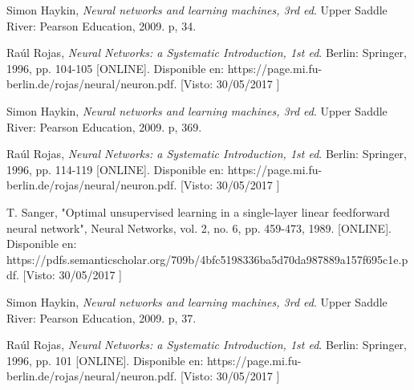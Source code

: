 \documentclass[11pt,spanish,answers]{exam}
\begin{document}
\begin{thebibliography}{1}

    Simon Haykin,
    \textit{Neural networks and learning machines, 3rd ed}. 
    Upper Saddle River: Pearson Education, 2009. p, 34.

    Raúl Rojas,
    \textit{Neural Networks: a Systematic Introduction, 1st ed}. 
    Berlin: Springer, 1996, pp. 104-105 [ONLINE]. Disponible en: https://page.mi.fu-berlin.de/rojas/neural/neuron.pdf. [Visto: 30/05/2017 ]

    Simon Haykin,
    \textit{Neural networks and learning machines, 3rd ed}. 
    Upper Saddle River: Pearson Education, 2009. p, 369.

    Raúl Rojas,
    \textit{Neural Networks: a Systematic Introduction, 1st ed}. 
    Berlin: Springer, 1996, pp. 114-119 [ONLINE]. Disponible en: https://page.mi.fu-berlin.de/rojas/neural/neuron.pdf. [Visto: 30/05/2017 ]


    T. Sanger,
    "Optimal unsupervised learning in a single-layer linear feedforward neural network", Neural Networks, vol. 2, no. 6, pp. 459-473, 1989. [ONLINE]. Disponible en: https://pdfs.semanticscholar.org/709b/4bfc5198336ba5d70da987889a157f695c1e.pdf. [Visto: 30/05/2017 ]

    Simon Haykin,
    \textit{Neural networks and learning machines, 3rd ed}. 
    Upper Saddle River: Pearson Education, 2009. p, 37.

    Raúl Rojas,
    \textit{Neural Networks: a Systematic Introduction, 1st ed}. 
    Berlin: Springer, 1996, pp. 101 [ONLINE]. Disponible en: https://page.mi.fu-berlin.de/rojas/neural/neuron.pdf. [Visto: 30/05/2017 ]

\end{thebibliography}
\end{document}
